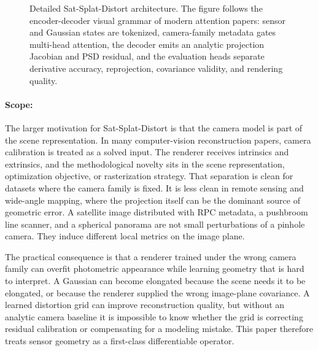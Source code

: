 \documentclass{article}
\makeatletter
\renewcommand{\scriptsize}{\@setfontsize\scriptsize\@viipt\@viiipt}
\renewcommand{\tiny}{\@setfontsize\tiny\@vipt\@viipt}
\makeatother
\begin{document}
\begin{figure}[t]
\caption{Detailed Sat-Splat-Distort architecture. The figure follows the encoder-decoder visual grammar of modern attention papers: sensor and Gaussian states are tokenized, camera-family metadata gates multi-head attention, the decoder emits an analytic projection Jacobian and PSD residual, and the evaluation heads separate derivative accuracy, reprojection, covariance validity, and rendering quality.}
\label{fig:sat-architecture}
\end{figure}

\paragraph{Scope:}

The larger motivation for Sat-Splat-Distort is that the camera model is part of the scene representation. In many computer-vision reconstruction papers, camera calibration is treated as a solved input. The renderer receives intrinsics and extrinsics, and the methodological novelty sits in the scene representation, optimization objective, or rasterization strategy. That separation is clean for datasets where the camera family is fixed. It is less clean in remote sensing and wide-angle mapping, where the projection itself can be the dominant source of geometric error. A satellite image distributed with RPC metadata, a pushbroom line scanner, and a spherical panorama are not small perturbations of a pinhole camera. They induce different local metrics on the image plane.

The practical consequence is that a renderer trained under the wrong camera family can overfit photometric appearance while learning geometry that is hard to interpret. A Gaussian can become elongated because the scene needs it to be elongated, or because the renderer supplied the wrong image-plane covariance. A learned distortion grid can improve reconstruction quality, but without an analytic camera baseline it is impossible to know whether the grid is correcting residual calibration or compensating for a modeling mistake. This paper therefore treats sensor geometry as a first-class differentiable operator.
\end{document}
